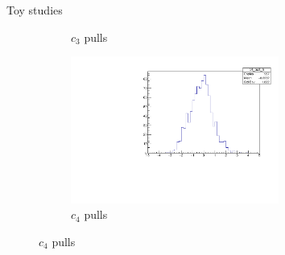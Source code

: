 \documentclass{beamer}
\begin{document}
\begin{frame}{Toy studies}
\begin{figure}
\begin{subfigure}{0.5\textwidth}
      \caption{$c_3$ pulls}
    \end{subfigure}%
    \begin{subfigure}{0.5\textwidth}
      \centering
      \includegraphics[width=0.75\textwidth,trim={0 0 0 0},clip=true]{Plots/c4_ToyFits_pull.pdf}
      \caption{$c_4$ pulls}
    \end{subfigure}
  \end{figure}
\end{frame}
\end{document}
